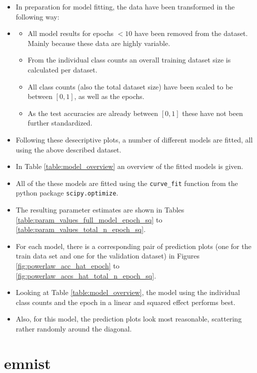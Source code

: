 \documentclass{article} %
\begin{document}
\begin{itemize}
    \item In preparation for model fitting, the data have been transformed in the following way:
    \item \begin{itemize}
              \item All model results for epochs $< 10$ have been removed from the dataset. Mainly because these data are highly variable.
              \item From the individual class counts an overall training dataset size is calculated per dataset.
              \item All class counts (also the total dataset size) have been scaled to be between $[0, 1]$, as well as the epochs.
              \item As the test accuracies are already between $[0,1]$ these have not been further standardized.
          \end{itemize}
    \item Following these desecriptive plots, a number of different models are fitted, all using the above described dataset.
    \item In Table \ref{table:model_overview} an overview of the fitted models is given.
    \item All of the these models are fitted using the \verb|curve_fit| function from the python package \verb|scipy.optimize|.
    \item The resulting parameter estimates are shown in Tables \ref{table:param_values_full_model_epoch_sq} to \ref{table:param_values_total_n_epoch_sq}.
    \item For each model, there is a corresponding pair of prediction plots (one for the train data set and one for the validation dataset) in Figures \ref{fig:powerlaw_acc_hat_epoch} to \ref{fig:powerlaw_accs_hat_total_n_epoch_sq}.
    \item Looking at Table \ref{table:model_overview}, the model using the individual class counts and the epoch in a linear and squared effect performs best.
    \item Also, for this model, the prediction plots look most reasonable, scattering rather randomly around the diagonal.
\end{itemize}


\section{emnist}
\end{document}
